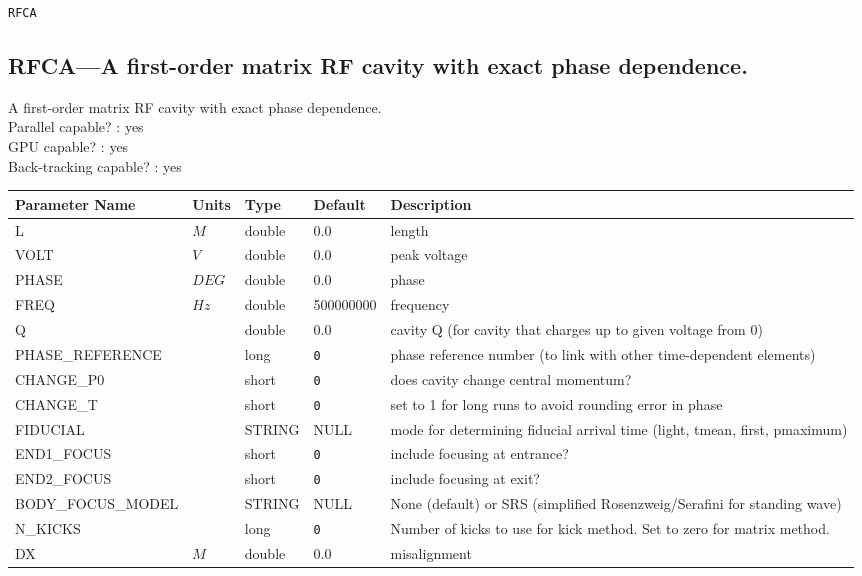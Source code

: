 \newpage
\begin{center}{\Large\verb|RFCA|}\end{center}
\subsection{RFCA---A first-order matrix RF cavity with exact phase dependence.}
A first-order matrix RF cavity with exact phase dependence.
\\
Parallel capable? : yes\\
GPU capable? : yes\\
Back-tracking capable? : yes\\
\begin{tabular}{|l|l|l|l|p{\descwidth}|} \hline
Parameter Name & Units & Type & Default & Description \\ \hline 
L & $M$ & double &  0.0 & length  \\ \hline 
VOLT & $V$ & double &  0.0 & peak voltage  \\ \hline 
PHASE & $DEG$ & double &  0.0 & phase  \\ \hline 
FREQ & $Hz$ & double &   500000000 & frequency  \\ \hline 
Q &  & double &  0.0 & cavity Q (for cavity that charges up to given voltage from 0)  \\ \hline 
PHASE\_REFERENCE &  & long &  \verb|0| & phase reference number (to link with other time-dependent elements)  \\ \hline 
CHANGE\_P0 &  & short &  \verb|0| & does cavity change central momentum?  \\ \hline 
CHANGE\_T &  & short &  \verb|0| & set to 1 for long runs to avoid rounding error in phase  \\ \hline 
FIDUCIAL &  & STRING &   NULL            & mode for determining fiducial arrival time (light, tmean, first, pmaximum)  \\ \hline 
END1\_FOCUS &  & short &  \verb|0| & include focusing at entrance?  \\ \hline 
END2\_FOCUS &  & short &  \verb|0| & include focusing at exit?  \\ \hline 
BODY\_FOCUS\_MODEL &  & STRING &   NULL            & None (default) or SRS (simplified Rosenzweig/Serafini for standing wave)  \\ \hline 
N\_KICKS &  & long &  \verb|0| & Number of kicks to use for kick method.  Set to zero for matrix method.  \\ \hline 
DX & $M$ & double &  0.0 & misalignment  \\ \hline 

\end{tabular}
